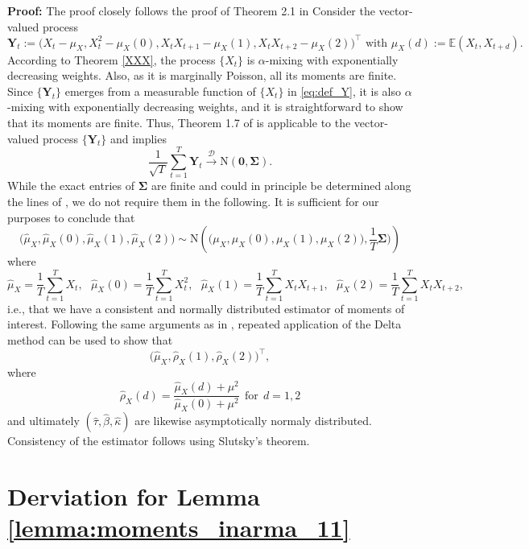 \documentclass{article}
\begin{document}
\textbf{Proof:} The proof closely follows the proof of Theorem 2.1 in \cite{Weiss2016} Consider the vector-valued process
\begin{equation}
\mathbf{Y}_t := \big(X_t - \mu_X, X^2_t - \mu_X(0), X_t X_{t + 1} - \mu_X(1) , X_t X_{t + 2} - \mu_X(2)\big)^\top \text{ with } \mu_X(d):= \mathbb{E}(X_t, X_{t + d}).\label{eq:def_Y}
\end{equation}
According to Theorem \ref{XXX}, the process $\{X_t\}$ is $ \alpha$-mixing with exponentially decreasing weights. Also, as it is marginally Poisson, all its moments are finite. Since $\{\mathbf{Y}_t\}$ emerges from a measurable function of $\{X_t\}$ in \eqref{eq:def_Y}, it is also $\alpha$-mixing with exponentially decreasing weights, and it is straightforward to show that its moments are finite. Thus, Theorem 1.7 of \cite{Ibragimov1962} is applicable to the vector-valued process $\{\mathbf{Y}_t\}$ and implies
$$
\frac{1}{\sqrt{T}} \sum_{t = 1}^T \mathbf{Y}_t \stackrel{\mathcal{D}}{\longrightarrow} \text{N}(\mathbf{0}, \mathbf{\Sigma}).
$$
While the exact entries of $\mathbf{\Sigma}$ are finite and could in principle be determined along the lines of \cite{Weiss2016}, we do not require them in the following. It is sufficient for our purposes to conclude that
$$
\big(\hat{\mu}_X, \hat{\mu}_X(0), \hat{\mu}_X(1), \hat{\mu}_X(2)\big) \sim \text{N}\left(\big(\mu_X, \mu_X(0), \mu_X(1), \mu_X(2)\big), \frac{1}{T}\mathbf{\Sigma})\right)
$$
where
$$
\hat{\mu}_X = \frac{1}{T} \sum_{t = 1}^T X_t,\ \ \ \hat{\mu}_X(0) = \frac{1}{T} \sum_{t = 1}^T X^2_t, \ \ \ \hat{\mu}_X(1) = \frac{1}{T} \sum_{t = 1}^T X_tX_{t + 1}, \ \ \ \hat{\mu}_X(2) = \frac{1}{T} \sum_{t = 1}^T X_tX_{t + 2},
$$
i.e., that we have a consistent and normally distributed estimator of moments of interest. Following the same arguments as in \cite{Weiss2016}, repeated application of the Delta method can be used to show that
$$
\big(\hat{\mu}_X, \hat{\rho}_X(1), \hat{\rho}_X(2)\big)^\top,
$$
where
$$
\hat{\rho}_X(d) = \frac{\hat{\mu}_X(d) + \mu^2}{\hat{\mu}_X(0) + \mu^2} \ \ \text{for} \ \ d = 1, 2
$$
and ultimately $(\hat{\tau}, \hat{\beta}, \hat{\kappa})$ are likewise asymptotically normaly distributed. Consistency of the estimator follows using Slutsky's theorem.

\section*{Derviation for Lemma \ref{lemma:moments_inarma_11}}
\end{document}
